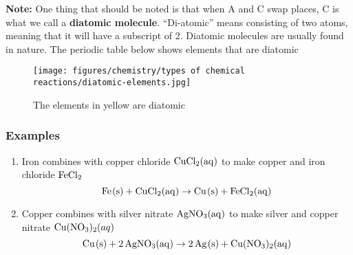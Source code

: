 \documentclass[12pt]{report}
\begin{document}
\textbf{Note:} One thing that should be noted is that when A and C swap places, C is what we call a \textbf{diatomic molecule}. ``Di-atomic'' means consisting of two atoms, meaning that it will have a subscript of 2. Diatomic molecules are usually found in nature. The periodic table below shows elements that are diatomic\\ 

\begin{figure}[htb!]
\centering
    \texttt{[image: figures/chemistry/types of chemical reactions/diatomic-elements.jpg]}
    \caption{The elements in yellow are diatomic}
\end{figure}

\subsubsection{Examples}
\begin{enumerate}
\setlength\itemsep{0.5em}
    \item{Iron combines with copper chloride $ \ce{CuCl2(aq)}$ to make copper and iron chloride $ \ce{FeCl2}$
            \[
                \ce{Fe(s)}+ \ce{CuCl2(aq)}\to \ce{Cu(s)}+ \ce{FeCl2(aq)}
            \]
        }
    \item{Copper combines with silver nitrate $ \ce{AgNO3(aq)}$ to make silver and copper nitrate $ \ce{Cu(NO3)2}(aq)$
            \[
                \ce{Cu(s)}+ \ce{2AgNO3(aq)}\to \ce{2Ag(s)}+ \ce{Cu(NO3)2(aq)}
            \]
        }
    
\end{enumerate}
\end{document}
